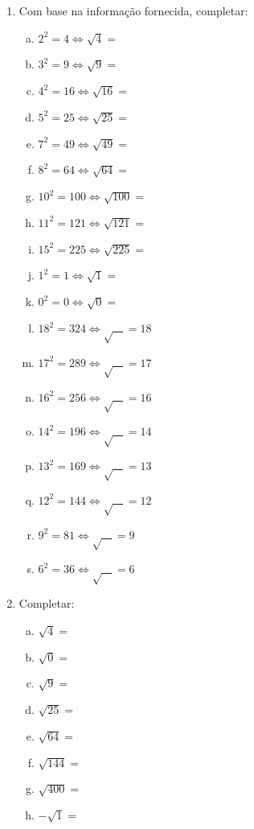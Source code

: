 \documentclass[a4paper,14pt]{article}
\begin{document}
\begin{multicols}{2}
\begin{enumerate}
		\item Com base na informação fornecida, completar:
		\begin{enumerate}[a)]
			\item $2^2 = 4 \Leftrightarrow \sqrt{4} = $
			\item $3^2 = 9 \Leftrightarrow \sqrt{9} = $
			\item $4^2 = 16 \Leftrightarrow \sqrt{16} = $ 
			\item $5^2 = 25 \Leftrightarrow \sqrt{25} = $
			\item $7^2 = 49 \Leftrightarrow \sqrt{49} = $
			\item $8^2 = 64 \Leftrightarrow \sqrt{64} = $
			\item $10^2 = 100 \Leftrightarrow \sqrt{100} = $
			\item $11^2 = 121 \Leftrightarrow \sqrt{121} = $
			\item $15^2 = 225 \Leftrightarrow \sqrt{225} = $
			\item $1^2 = 1 \Leftrightarrow \sqrt{1} = $
			\item $0^2 = 0 \Leftrightarrow \sqrt{0} = $
			\item $18^2 = 324 \Leftrightarrow \sqrt{~~~~} = 18$
			\item $17^2 = 289 \Leftrightarrow \sqrt{~~~~} = 17$
			\item $16^2 = 256 \Leftrightarrow \sqrt{~~~~} = 16$
			\item $14^2 = 196 \Leftrightarrow \sqrt{~~~~} = 14$
			\item $13^2 = 169 \Leftrightarrow \sqrt{~~~~} = 13$
			\item $12^2 = 144 \Leftrightarrow \sqrt{~~~~} = 12$
			\item $9^2 = 81 \Leftrightarrow \sqrt{~~~~} = 9$
			\item $6^2 = 36 \Leftrightarrow \sqrt{~~~~} = 6$
	    \end{enumerate}
    	\item Completar:
        \begin{enumerate}[a)]
        	\item $\sqrt{4} = $
        	\item $\sqrt{0} = $
        	\item $\sqrt{9} = $
        	\item $\sqrt{25} = $
        	\item $\sqrt{64} = $
        	\item $\sqrt{144} = $
        	\item $\sqrt{400} = $
        	\item $-\sqrt{1} = $

\end{enumerate}
\end{enumerate}
\end{multicols}
\end{document}
